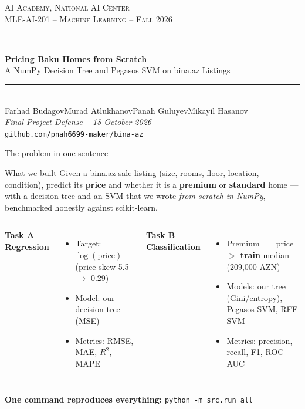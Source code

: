 \documentclass[aspectratio=169,11pt]{beamer}
\newcommand{\projecttitle}{Pricing Baku Homes from Scratch}
\newcommand{\projectsub}{A NumPy Decision Tree and Pegasos SVM on bina.az Listings}
\newcommand{\memberone}{Farhad Budagov}
\newcommand{\membertwo}{Murad Atlukhanov}
\newcommand{\memberthree}{Panah Guluyev}
\newcommand{\memberfour}{Mikayil Hasanov}
\newcommand{\repolink}{github.com/pnah6699-maker/bina-az}
\newcommand{\presdate}{18 October 2026}
\newcommand{\coursecode}{MLE-AI-201}
\newcommand{\coursename}{Machine Learning}
\newcommand{\institution}{AI Academy, National AI Center}
\newcommand{\semester}{Fall 2026}
\begin{document}
{%
\begin{frame}[plain]
  \begin{center}
    \vspace{0.4cm}
    {\small \textsc{\institution}}\\[0.2em]
    {\small \textsc{\coursecode{} -- \coursename{} -- \semester{}}}\\[1.0em]
    \rule{0.8\textwidth}{0.6pt}\\[0.4em]
    {\LARGE\bfseries\color{accent} \projecttitle}\\[0.3em]
    {\large\color{accent} \projectsub}\\[0.3em]
    \rule{0.8\textwidth}{0.6pt}\\[1.0em]
    {\normalsize \memberone\quad\textbullet\quad\membertwo\quad\textbullet\quad\memberthree\quad\textbullet\quad\memberfour}\\[0.9cm]
    {\footnotesize\itshape Final Project Defense -- \presdate}\\[0.4em]
    {\footnotesize\texttt{\repolink}}
  \end{center}
\end{frame}
}

\begin{frame}{The problem in one sentence}
  \begin{block}{What we built}
    Given a bina.az sale listing (size, rooms, floor, location, condition),
    predict its \textbf{price} and whether it is a \textbf{premium} or
    \textbf{standard} home --- with a decision tree and an SVM that we wrote
    \emph{from scratch in NumPy}, benchmarked honestly against scikit-learn.
  \end{block}

  \vspace{0.3em}
  \begin{columns}[T,onlytextwidth]
  \textbf{Task A --- Regression}
  \begin{itemize}
    \item Target: $\log(\text{price})$ (price skew 5.5 $\rightarrow$ 0.29)
    \item Model: our decision tree (MSE)
    \item Metrics: RMSE, MAE, $R^2$, MAPE
  \end{itemize}

  \textbf{Task B --- Classification}
  \begin{itemize}
    \item Premium $=$ price $>$ \textbf{train} median (209{,}000 AZN)
    \item Models: our tree (Gini/entropy), Pegasos SVM, RFF-SVM
    \item Metrics: precision, recall, F1, ROC-AUC
  \end{itemize}
  \end{columns}

  \vspace{0.4em}
  \textbf{One command reproduces everything:} \texttt{python -m src.run\_all}
\end{frame}
\end{document}
